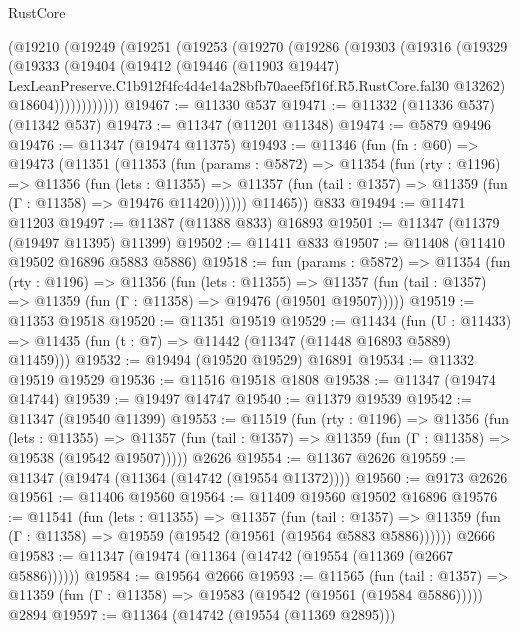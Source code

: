 \begin{lexlean}{RustCore}
\begin{coremodule}
    (@19210
      (@19249
        (@19251
          (@19253
            (@19270
              (@19286
                (@19303
                  (@19316
                    (@19329
                      (@19333
                        (@19404
                          (@19412
                            (@19446
                              (@11903 @19447)
                              LexLeanPreserve.C1b912f4fc4d4e14a28bfb70aeef5f16f.R5.RustCore.fal30
                              @13262)
                            @18604))))))))))))
@19467 := @11330 @537
@19471 := @11332 (@11336 @537) (@11342 @537)
@19473 := @11347 (@11201 @11348)
@19474 := @5879 @9496
@19476 := @11347 (@19474 @11375)
@19493 := @11346
    (fun (fn : @60) =>
    @19473
      (@11351
        (@11353
          (fun (params : @5872) =>
          @11354
            (fun (rty : @1196) =>
            @11356
              (fun (lets : @11355) =>
              @11357 (fun (tail : @1357) => @11359 (fun (Γ : @11358) => @19476 @11420))))))
        @11465))
    @833
@19494 := @11471 @11203
@19497 := @11387 (@11388 @833) @16893
@19501 := @11347 (@11379 (@19497 @11395) @11399)
@19502 := @11411 @833
@19507 := @11408 (@11410 @19502 @16896 @5883 @5886)
@19518 := fun (params : @5872) =>
  @11354
    (fun (rty : @1196) =>
    @11356
      (fun (lets : @11355) =>
      @11357 (fun (tail : @1357) => @11359 (fun (Γ : @11358) => @19476 (@19501 @19507)))))
@19519 := @11353 @19518
@19520 := @11351 @19519
@19529 := @11434
    (fun (U : @11433) => @11435 (fun (t : @7) => @11442 (@11347 (@11448 @16893 @5889) @11459)))
@19532 := @19494 (@19520 @19529) @16891
@19534 := @11332 @19519 @19529
@19536 := @11516 @19518 @1808
@19538 := @11347 (@19474 @14744)
@19539 := @19497 @14747
@19540 := @11379 @19539
@19542 := @11347 (@19540 @11399)
@19553 := @11519
    (fun (rty : @1196) =>
    @11356
      (fun (lets : @11355) =>
      @11357 (fun (tail : @1357) => @11359 (fun (Γ : @11358) => @19538 (@19542 @19507)))))
    @2626
@19554 := @11367 @2626
@19559 := @11347 (@19474 (@11364 (@14742 (@19554 @11372))))
@19560 := @9173 @2626
@19561 := @11406 @19560
@19564 := @11409 @19560 @19502 @16896
@19576 := @11541
    (fun (lets : @11355) =>
    @11357
      (fun (tail : @1357) =>
      @11359 (fun (Γ : @11358) => @19559 (@19542 (@19561 (@19564 @5883 @5886))))))
    @2666
@19583 := @11347 (@19474 (@11364 (@14742 (@19554 (@11369 (@2667 @5886))))))
@19584 := @19564 @2666
@19593 := @11565
    (fun (tail : @1357) => @11359 (fun (Γ : @11358) => @19583 (@19542 (@19561 (@19584 @5886)))))
    @2894
@19597 := @11364 (@14742 (@19554 (@11369 @2895)))

\end{coremodule}
\end{lexlean}
